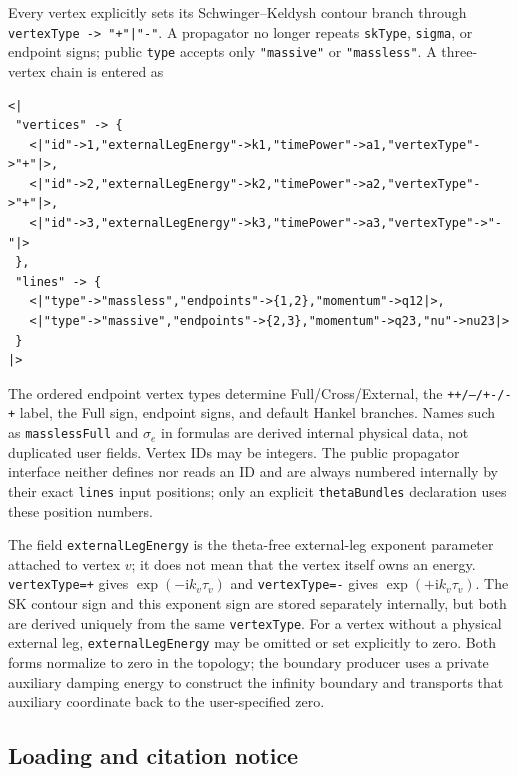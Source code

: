 \documentclass[11pt,a4paper]{article}
\newcommand{\ii}{\mathrm i}
\begin{document}
Every vertex explicitly sets its Schwinger--Keldysh contour branch through
\texttt{vertexType -> "+"|"-"}. A propagator no longer repeats \texttt{skType},
\texttt{sigma}, or endpoint signs; public \texttt{type} accepts only \texttt{"massive"}
or \texttt{"massless"}. A three-vertex chain is entered as
\begin{verbatim}
<|
 "vertices" -> {
   <|"id"->1,"externalLegEnergy"->k1,"timePower"->a1,"vertexType"->"+"|>,
   <|"id"->2,"externalLegEnergy"->k2,"timePower"->a2,"vertexType"->"+"|>,
   <|"id"->3,"externalLegEnergy"->k3,"timePower"->a3,"vertexType"->"-"|>
 },
 "lines" -> {
   <|"type"->"massless","endpoints"->{1,2},"momentum"->q12|>,
   <|"type"->"massive","endpoints"->{2,3},"momentum"->q23,"nu"->nu23|>
 }
|>
\end{verbatim}
The ordered endpoint vertex types determine Full/Cross/External, the
\texttt{++/--/+-/-+} label, the Full sign, endpoint signs, and default Hankel branches.
Names such as \texttt{masslessFull} and $\sigma_e$ in formulas are derived internal physical
data, not duplicated user fields. Vertex IDs may be integers. The public propagator interface neither defines nor reads an ID and
are always numbered internally by their exact \texttt{lines} input positions; only an explicit
\texttt{thetaBundles} declaration uses these position numbers.

The field \texttt{externalLegEnergy} is the theta-free external-leg exponent parameter
attached to vertex $v$; it does not mean that the vertex itself owns an energy.
\texttt{vertexType=+} gives $\exp(-\ii k_v\tau_v)$ and \texttt{vertexType=-} gives
$\exp(+\ii k_v\tau_v)$. The SK contour sign and this exponent sign are stored separately
internally, but both are derived uniquely from the same \texttt{vertexType}.
For a vertex without a physical external leg, \texttt{externalLegEnergy} may be omitted or
set explicitly to zero.  Both forms normalize to zero in the topology; the boundary producer
uses a private auxiliary damping energy to construct the infinity boundary and transports that
auxiliary coordinate back to the user-specified zero.

\subsection{Loading and citation notice}
\end{document}
